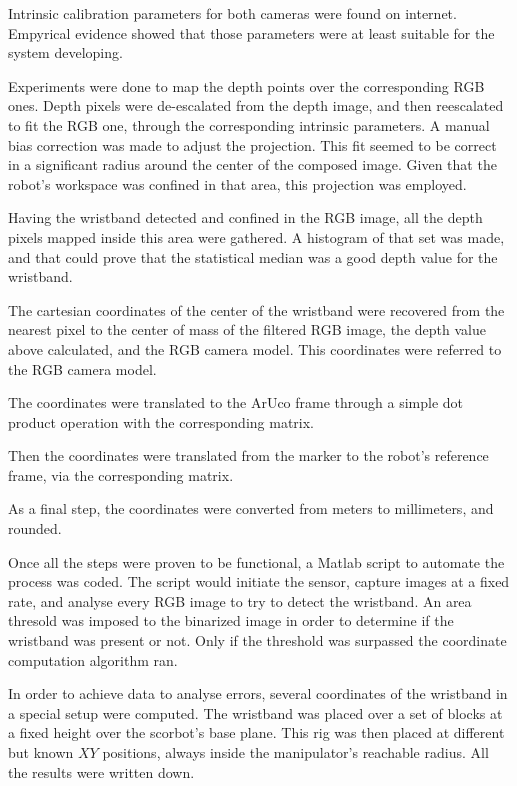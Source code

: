 \documentclass[12pt,a4paper,titlepage]{article}
\begin{document}
Intrinsic calibration parameters for both cameras were found on internet. Empyrical evidence showed that those parameters were at least suitable for the system developing. 

Experiments were done to map the depth points over the corresponding RGB ones. Depth pixels were de-escalated from the depth image, and then reescalated to fit the RGB one, through the corresponding intrinsic parameters. A manual bias correction was made to adjust the projection. This fit seemed to be correct in a significant radius around the center of the composed image. Given that the robot's workspace was confined in that area, this projection was employed.

Having the wristband detected and confined in the RGB image, all the depth pixels mapped inside this area were gathered. A histogram of that set was made, and that could prove that the statistical median was a good depth value for the wristband.

The cartesian coordinates of the center of the wristband were recovered from the nearest pixel to the center of mass of the filtered RGB image, the depth value above calculated, and the RGB camera model. This coordinates were referred to the RGB camera model.

The coordinates were translated to the ArUco frame through a simple dot product operation with the corresponding matrix.

Then the coordinates were translated from the marker to the robot's reference frame, via the corresponding matrix.

As a final step, the coordinates were converted from meters to millimeters, and rounded.

Once all the steps were proven to be functional, a Matlab script to automate the process was coded. The script would initiate the sensor, capture images at a fixed rate, and analyse every RGB image to try to detect the wristband. An area thresold was imposed to the binarized image in order to determine if the wristband was present or not. Only if the threshold was surpassed the coordinate computation algorithm ran.


In order to achieve data to analyse errors, several coordinates of the wristband in a special setup were computed. The wristband was placed over a set of blocks at a fixed height over the scorbot's base plane. This rig was then placed at different but known $XY$ positions, always inside the manipulator's reachable radius. All the results were written down.
\end{document}
